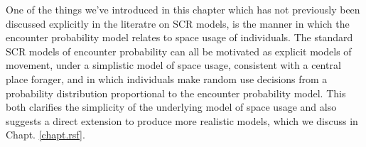 {{One of the things we've introduced in this chapter which has not
previously been discussed explicitly in the literatre on SCR models,
is the manner in which the encounter probability model relates to
space usage of individuals. The standard SCR models of encounter
probability can all be motivated as explicit models of movement, under
a simplistic model of space usage, consistent with a central place
forager, and  in which individuals make random use
decisions from a probability distribution proportional to the
encounter probability model. This both clarifies the simplicity of the
underlying model of space usage and also suggests a direct extension
to produce more realistic models, which we discuss in Chapt. \ref{chapt.rsf}.

}}
